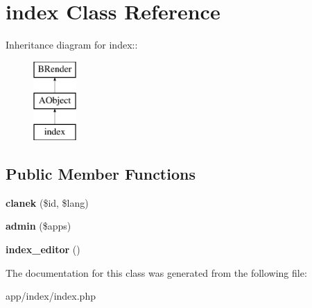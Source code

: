 \section{index Class Reference}
\label{classindex}
Inheritance diagram for index::\begin{figure}[H]
\begin{center}
\leavevmode
\includegraphics[height=3cm]{classindex}
\end{center}
\end{figure}
\subsection*{Public Member Functions}
\begin{DoxyCompactItemize}
\item 
{\bfseries clanek} (\$id, \$lang)\label{classindex_a4412029624092e3e41c73fdde3fbfac9}

\item 
{\bfseries admin} (\$apps)\label{classindex_a9b4e261c39cdf31143facc36363e209a}

\item 
{\bfseries index\_\-editor} ()\label{classindex_a6324732f87a1cdb27339e8e01243e5aa}

\end{DoxyCompactItemize}


The documentation for this class was generated from the following file:\begin{DoxyCompactItemize}
\item 
app/index/index.php\end{DoxyCompactItemize}
